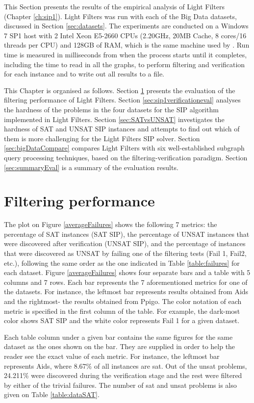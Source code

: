 \documentclass{l4proj}
\newcounter{example}[section]
\begin{document}
This Section presents the results of the empirical analysis of Light Filters (Chapter \ref{ch:sip1}). Light Filters was run with each of the Big Data datasets, discussed in Section \ref{sec:datasets}. The experiments are conducted on a Windows 7 SP1 host with 2 Intel Xeon E5-2660 CPUs (2.20GHz, 20MB Cache, 8 cores/16 threads per CPU) and 128GB of RAM, which is the same machine used by \cite{foteini}. Run time is measured in milliseconds from when the process starts until it completes, including the time to read in all the graphs, to perform filtering and verification for each instance and to write out all results to a file.

This Chapter is organised as follows. Section \ref{sec:sip1filterseval} presents the evaluation of the filtering performance of Light Filters. Section \ref{sec:sip1verificationeval} analyses the hardness of the problems in the four datasets for the SIP algorithm implemented in Light Filters. Section \ref{sec:SATvsUNSAT} investigates the hardness of SAT and UNSAT SIP instances and attempts to find out which of them is more challenging for the Light Filters SIP solver. Section \ref{sec:bigDataCompare} compares Light Filters with six well-established subgraph query processing techniques, based on the filtering-verification paradigm. Section \ref{sec:summaryEval} is a summary of the evaluation results.

\section{Filtering performance}
\label{sec:sip1filterseval}
The plot on Figure \ref{averageFailures} shows the following 7 metrics: the percentage of SAT instances (SAT SIP), the percentage of UNSAT instances that were discovered after verification (UNSAT SIP), and the percentage of instances that were discovered as UNSAT by failing one of the filtering tests (Fail 1, Fail2, etc.), following the same order as the one indicated in Table \ref{table:failures} for each dataset. Figure \ref{averageFailures} shows four separate bars and a table with 5 columns and 7 rows. Each bar represents the 7 aforementioned metrics for one of the datasets. For instance, the leftmost bar represents results obtained from Aids and the rightmost- the results obtained from Ppigo. The color notation of each metric is specified in the first column of the table. For example, the dark-most color shows SAT SIP and the white color represents Fail 1 for a given dataset.

Each table column under a given bar contains the same figures for the same dataset as the ones shown on the bar. They are supplied in order to help the reader see the exact value of each metric. For instance, the leftmost bar represents Aids, where 8.67\% of all instances are \gls{sat}. Out of the \gls{unsat} problems, 24.211\% were discovered during the verification stage and the rest were filtered by either of the trivial failures. The number of \gls{sat} and \gls{unsat} problems is also given on Table \ref{table:dataSAT}.
\end{document}

